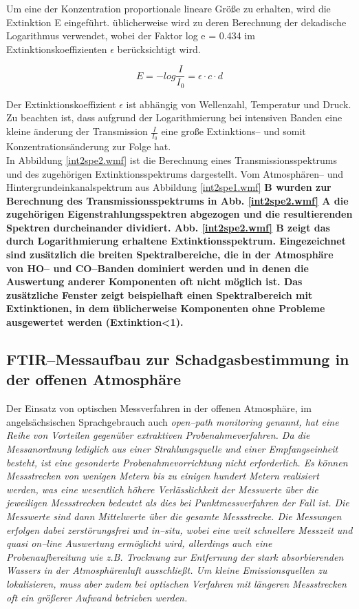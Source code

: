 Um eine der Konzentration proportionale lineare Grö{\ss}e zu erhalten,
wird die Extinktion E eingeführt. üblicherweise wird zu deren
Berechnung der dekadische Logarithmus verwendet, wobei der Faktor
log e = 0.434 im Extinktionskoeffizienten $\epsilon$
berücksichtigt wird.

\begin{equation}\label{eqlbext}
  E=-log \frac{I}{I_0} = \epsilon \cdot c \cdot d
\end{equation}

Der Extinktionskoeffizient $\epsilon$ ist abhängig von Wellenzahl,
Temperatur und Druck. Zu beachten ist, dass aufgrund der
Logarithmierung bei intensiven Banden eine kleine änderung der
Transmission $\frac{I}{I_0}$ eine gro{\ss}e Extinktions-- und somit
Konzentrationsänderung zur Folge hat.\\

In Abbildung \ref{int2spe2.wmf} ist die Berechnung eines
Transmissionsspektrums und des zugehörigen Extinktionsspektrums
dargestellt. Vom Atmosphären-- und Hintergrundeinkanalspektrum aus
Abbildung \ref{int2spe1.wmf} \bf B \rm wurden zur Berechnung des
Transmissionsspektrums in Abb. \ref{int2spe2.wmf} \bf A \rm die
zugehörigen Eigenstrahlungsspektren abgezogen und die
resultierenden Spektren durcheinander dividiert. Abb.
\ref{int2spe2.wmf} \bf B \rm zeigt das durch Logarithmierung
erhaltene Extinktionsspektrum. Eingezeichnet sind zusätzlich die
breiten Spektralbereiche, die in der Atmosphäre von HO--
und CO--Banden dominiert werden und in denen die
Auswertung anderer Komponenten oft nicht möglich ist. Das
zusätzliche Fenster zeigt beispielhaft einen Spektralbereich mit
Extinktionen, in dem üblicherweise Komponenten ohne Probleme
ausgewertet werden (Extinktion<1).

\subsection{\label{openpath}FTIR--Messaufbau zur Schadgasbestimmung
in der offenen Atmosphäre}

Der Einsatz von optischen Messverfahren in der offenen Atmosphäre,
im angelsächsischen Sprachgebrauch auch \it open--path monitoring
\rm genannt, hat eine Reihe von Vorteilen gegenüber extraktiven
Probenahmeverfahren. Da die Messanordnung lediglich aus einer
Strahlungsquelle und einer Empfangseinheit besteht, ist eine
gesonderte Probenahmevorrichtung nicht erforderlich. Es können
Messstrecken von wenigen Metern bis zu einigen hundert Metern
realisiert werden, was eine wesentlich höhere Verlässlichkeit der
Messwerte über die jeweiligen Messstrecken bedeutet als dies bei
Punktmessverfahren der Fall ist. Die Messwerte sind dann
Mittelwerte über die gesamte Messstrecke. Die Messungen erfolgen
dabei zerstörungsfrei und \it in--situ\rm , wobei eine weit
schnellere Messzeit und quasi on--line Auswertung ermöglicht wird,
allerdings auch eine Probenaufbereitung wie z.B. Trocknung zur
Entfernung der stark absorbierenden Wassers in der Atmosphärenluft
ausschlie{\ss}t. Um kleine Emissionsquellen zu lokalisieren, muss aber
zudem bei optischen Verfahren mit längeren Messstrecken oft ein
grö{\ss}erer Aufwand betrieben werden.\\

